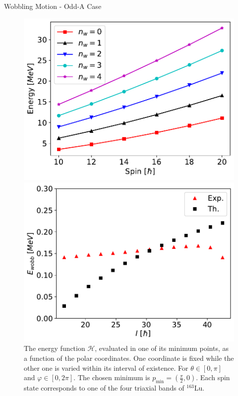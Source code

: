 \documentclass[final]{beamer}
\newlength{\colwidth}
\begin{document}
\begin{frame}[t]
\begin{columns}[t]
\begin{column}{\colwidth}
    \begin{block}{Wobbling Motion - Odd-A Case}
 \begin{figure}
\centering
\begin{minipage}{.5\textwidth}
  \centering
  \includegraphics[scale=0.8]{images/simple_wobbling_spectrum.pdf}
\end{minipage}%
\begin{minipage}{.5\textwidth}
  \centering
 \includegraphics[scale=0.8]{images/wobbling_energy_ThExp.pdf}
\end{minipage}
\caption{The energy function $\mathcal{H}$, evaluated in one of its minimum points, as a function of the polar coordinates. One coordinate is fixed while the other one is varied within its interval of existence. For $\theta\in[0,\pi]$ and $\varphi\in[0,2\pi]$. The chosen minimum is $p_\text{min}=\left(\frac{\pi}{2},0\right)$. Each spin state corresponds to one of the four triaxial bands of $^{163}$Lu.}
    \label{energy-function-min-point-evolution}
\end{figure}
  \end{block}


\end{column}
\end{columns}
\end{frame}
\end{document}

